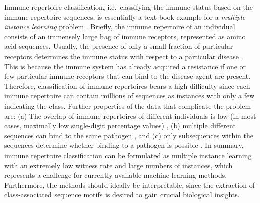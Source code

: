 \documentclass[oneside]{book}
\begin{document}
%
Immune repertoire classification, i.e.\ classifying the immune status 
based on the immune repertoire sequences, is essentially a text-book example for  
a \emph{multiple instance learning} problem \citep{dietterich1997solving,maron1998framework,wang2018revisiting}.
%
Briefly, the immune repertoire of an individual
consists of an immensely large bag of 
immune receptors, represented as amino acid sequences.
Usually, the presence of only a small fraction 
of particular receptors determines the immune 
status with respect to a particular disease \citep{christophersen2014tetramer, emerson2017immunosequencing}.
This is because 
the immune system has already acquired a resistance 
if one or few particular immune receptors that can bind to the disease agent are present.
%
Therefore, classification of immune repertoires
bears a high difficulty since each immune repertoire can contain millions
of sequences as instances with only a few indicating the class.
Further properties of the data that complicate the problem are:
(a) The overlap of immune repertoires of different individuals is low (in most cases, maximally low single-digit percentage values) \citep{greiff2017learning, elhanati2018predicting},
(b) multiple different sequences can bind to the same pathogen \citep{wucherpfennig2007polyspecificity}, and 
(c) only subsequences within the sequences determine
whether binding to a pathogen is possible \citep{dash2017quantifiable,glanville2017identifying, akbar2019compact,springer2020tcrpeptidebinding,fischer2019predicting}. 
In summary, immune repertoire classification can be formulated 
as multiple instance learning with an extremely low witness rate and large numbers
of instances, which represents a challenge for currently available machine learning methods.
Furthermore, the methods should ideally be interpretable, since 
the extraction of class-associated sequence motifs is desired to gain 
crucial biological insights.
%
\end{document}
